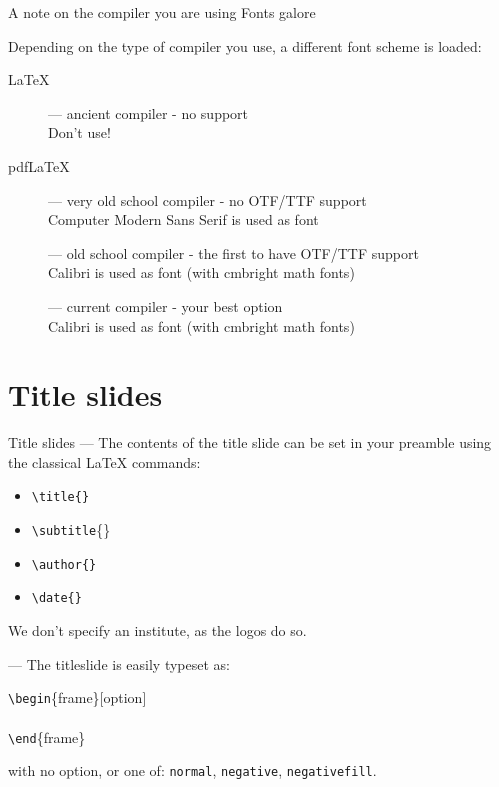 \documentclass[aspectratio=1610]{beamer}
\newcommand*\command[1]{{\tt \textbackslash #1}}
\newcommand*\ind[1][2ex]{\hspace*{#1}}
\newcommand*\bframe[1][]{\command{begin}\{#1frame\}}
\newcommand*\eframe[1][]{\command{end}\{#1frame\}}
\begin{document}
\begin{frame}[t]
  {A note on the compiler you are using}
  {Fonts galore}

  Depending on the type of compiler you use, a different font scheme
  is loaded:
  \begin{description}
  \item[\LaTeX] --- ancient compiler - no support\\
    Don't use!
  \item[pdf\LaTeX] --- very old school compiler - no OTF/TTF support\\
    Computer Modern Sans Serif is used as font
  \item[\XeLaTeX] --- old school compiler - the first to have OTF/TTF
    support\\
    Calibri is used as font (with cmbright math fonts)
  \item[\LuaLaTeX] --- current compiler - your best option\\
    Calibri is used as font (with cmbright math fonts)
  \end{description}

\end{frame}

\section{Title slides}

\begin{frame}[negative]
  \sectionpage
\end{frame}

\begin{frame}[t]
  {Title slides}
   ---
  The contents of the title slide can be set in your preamble
  using the classical \LaTeX{} commands:
  \begin{itemize}
  \item \command{title\{\}}
  \item \command{subtitle}\{\}
  \item \command{author\{\}}
  \item \command{date\{\}}
  \end{itemize}
  We don't specify an institute, as the logos do so.

   --- The titleslide is easily typeset as:\\
  \begin{codesnippet}
    \bframe[][option]\\
    \ind\command{maketitle}\\
    \eframe
  \end{codesnippet}

  with no option, or one of: \texttt{normal}, \texttt{negative},
  \texttt{negativefill}.
\end{frame}
\end{document}
